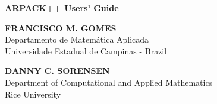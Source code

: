\begin{titlepage}
\textbf{\Huge ARPACK++ Users' Guide}

\vspace{\fill}

\textbf{FRANCISCO M. GOMES}\\
Departamento de Matemática Aplicada\\
Universidade Estadual de Campinas - Brazil

\vspace{1em}

\textbf{DANNY C. SORENSEN}\\
Department of Computational and Applied Mathematics\\
Rice University

\vspace{3em}


{\Large \ccLogo \ \ccAttribution \ \ccShareAlike}
\end{titlepage}
